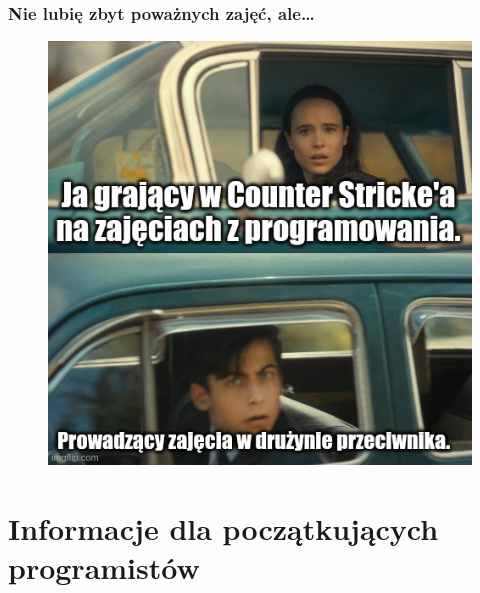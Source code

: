 \documentclass[10pt,t]{beamer}
\begin{document}
\begin{frame}
  \frametitle{Nie lubię zbyt poważnych zajęć, ale\ldots}

  \vspace{-0.5em}


  \begin{figure}

    \label{fig:Jak-to-bywa-na-zajeciach}

    \centering


    \includegraphics[scale=0.42]
    {./Presentations-pictures/Jak-to-bywa-na-zajeciach.jpeg}

  \end{figure}

\end{frame}










\section{Informacje dla początkujących programistów}
\end{document}
